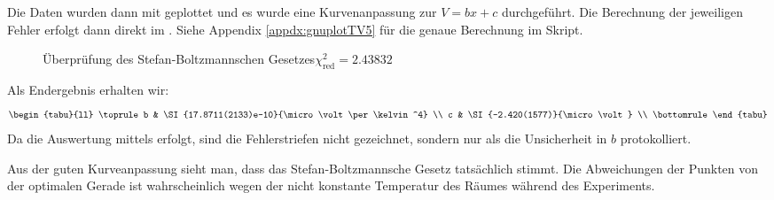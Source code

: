 	Die Daten wurden dann mit \gnuplot{} geplottet und es wurde eine Kurvenanpassung zur $V = bx + c$ durchgeführt. Die Berechnung der jeweiligen Fehler erfolgt dann direkt im \gnuplot{}. Siehe Appendix \ref{appdx:gnuplotTV5} für die genaue Berechnung im Skript. 
	\begin{figure}[H]
		\centering
		
		\caption{\centering Überprüfung des Stefan-Boltzmannschen Gesetzes\captionbr $\chi^2_{\text{red}} = \num{2.43832}$}
		\label{fig:tvfive-plot}
		\vspace{-1em}
	\end{figure}
	Als Endergebnis erhalten wir:
	\begin{equation*}
		\begin{tabu}{ll}
			\toprule
			b & \SI{17.8711(2133)e-10}{\micro\volt\per\kelvin^4} \\
			c & \SI{-2.420(1577)}{\micro\volt} \\
			\bottomrule
		\end{tabu}
	\end{equation*}
	Da die Auswertung mittels \gnuplot{} erfolgt, sind die Fehlerstriefen nicht gezeichnet, sondern nur als die Unsicherheit in $b$ protokolliert. 

	Aus der guten Kurveanpassung sieht man, dass das Stefan-Boltzmannsche Gesetz tatsächlich stimmt. Die Abweichungen der Punkten von der optimalen Gerade ist wahrscheinlich wegen der nicht konstante Temperatur des Räumes während des Experiments. 